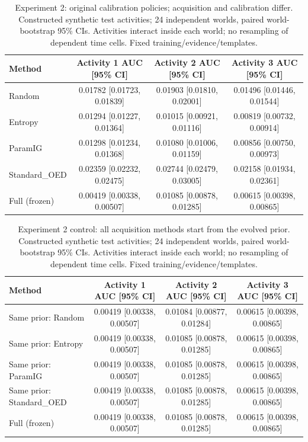 \documentclass[10pt]{article}
\begin{document}
\clearpage
\begin{table}[t]
\centering
\small
\caption{Experiment 2: original calibration policies; acquisition and calibration differ. Constructed synthetic test activities; 24 independent worlds, paired world-bootstrap 95\% CIs. Activities interact inside each world; no resampling of dependent time cells. Fixed training/evidence/templates.}
\begin{tabular}{lccc}
\toprule
Method & Activity 1 AUC [95\% CI] & Activity 2 AUC [95\% CI] & Activity 3 AUC [95\% CI] \\
\midrule
Random & 0.01782 [0.01723, 0.01839] & 0.01903 [0.01810, 0.02001] & 0.01496 [0.01446, 0.01544] \\
Entropy & 0.01294 [0.01227, 0.01364] & 0.01015 [0.00921, 0.01116] & 0.00819 [0.00732, 0.00914] \\
ParamIG & 0.01298 [0.01234, 0.01368] & 0.01080 [0.01006, 0.01159] & 0.00856 [0.00750, 0.00973] \\
Standard\_OED & 0.02359 [0.02232, 0.02475] & 0.02744 [0.02479, 0.03005] & 0.02158 [0.01934, 0.02361] \\
Full (frozen) & 0.00419 [0.00338, 0.00507] & 0.01085 [0.00878, 0.01285] & 0.00615 [0.00398, 0.00865] \\
\bottomrule
\end{tabular}
\end{table}
\begin{table}[t]
\centering
\small
\caption{Experiment 2 control: all acquisition methods start from the evolved prior. Constructed synthetic test activities; 24 independent worlds, paired world-bootstrap 95\% CIs. Activities interact inside each world; no resampling of dependent time cells. Fixed training/evidence/templates.}
\begin{tabular}{lccc}
\toprule
Method & Activity 1 AUC [95\% CI] & Activity 2 AUC [95\% CI] & Activity 3 AUC [95\% CI] \\
\midrule
Same prior: Random & 0.00419 [0.00338, 0.00507] & 0.01084 [0.00877, 0.01284] & 0.00615 [0.00398, 0.00865] \\
Same prior: Entropy & 0.00419 [0.00338, 0.00507] & 0.01085 [0.00878, 0.01285] & 0.00615 [0.00398, 0.00865] \\
Same prior: ParamIG & 0.00419 [0.00338, 0.00507] & 0.01085 [0.00878, 0.01285] & 0.00615 [0.00398, 0.00865] \\
Same prior: Standard\_OED & 0.00419 [0.00338, 0.00507] & 0.01085 [0.00878, 0.01285] & 0.00615 [0.00398, 0.00865] \\
Full (frozen) & 0.00419 [0.00338, 0.00507] & 0.01085 [0.00878, 0.01285] & 0.00615 [0.00398, 0.00865] \\
\bottomrule
\end{tabular}
\end{table}
\end{document}
